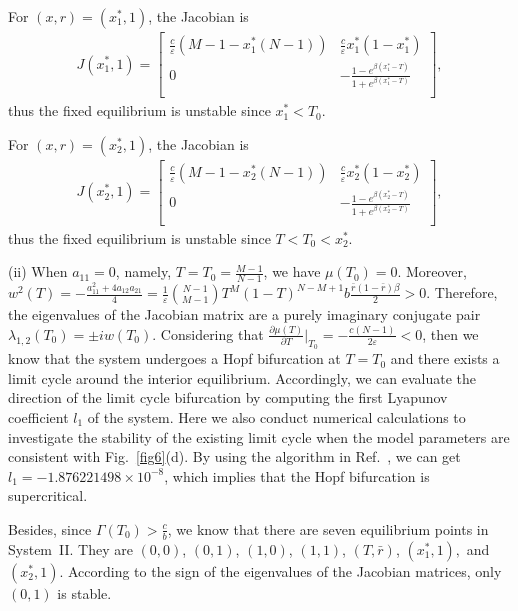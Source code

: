 \documentclass[9pt]{elife}
\begin{document}
\begin{appendixbox}
For $(x, r) = (x_{1}^{*}, 1)$, the Jacobian is
\begin{eqnarray*}
J(x_{1}^{*}, 1) =
  \left[ {\begin{array}{cc}
    \frac{c}{\varepsilon}(M-1-x_{1}^{*}(N-1)) & \frac{c}{\varepsilon}x_{1}^{*}(1-x_{1}^{*}) \\
    0 & -\frac{1-e^{\beta (x_{1}^{*}-T)}}{1+e^{\beta (x_{1}^{*}-T)}} \\
  \end{array} } \right],
\end{eqnarray*}
thus the fixed equilibrium is unstable since $x_{1}^{*}<T_{0}$.

For $(x, r) = (x_{2}^{*}, 1)$, the Jacobian is
\begin{eqnarray*}
J(x_{2}^{*}, 1) =
  \left[ {\begin{array}{cc}
    \frac{c}{\varepsilon}(M-1-x_{2}^{*}(N-1)) & \frac{c}{\varepsilon}x_{2}^{*}(1-x_{2}^{*}) \\
    0 & -\frac{1-e^{\beta (x_{2}^{*}-T)}}{1+e^{\beta (x_{2}^{*}-T)}} \\
  \end{array} } \right],
\end{eqnarray*}
thus the fixed equilibrium is unstable since $T<T_{0}<x_{2}^{*}$.


(ii) When $a_{11}=0$, namely, $T=T_{0}=\frac{M-1}{N-1}$, we have $\mu(T_{0})=0$. Moreover, $w^{2}(T)=-\frac{a_{11}^{2}+4a_{12}a_{21}}{4}=\frac{1}{\varepsilon}\binom{N-1}{M-1}T^{M}(1-T)^{N-M+1}b\frac{\bar{r}(1-\bar{r})\beta}{2}>0$. Therefore, the eigenvalues of the Jacobian matrix are a purely imaginary conjugate pair $\lambda_{1,2}(T_{0})=\pm iw(T_{0})$. Considering that $\frac{\partial \mu(T)}{\partial T}|_{T_{0}}=-\frac{c(N-1)}{2\varepsilon}<0$, then we know that the system undergoes a Hopf bifurcation at $T=T_{0}$ and there exists a limit cycle around the interior equilibrium. Accordingly, we can evaluate the direction of the limit cycle bifurcation by computing the first Lyapunov coefficient $l_{1}$ of the system. Here we also conduct numerical calculations to investigate the stability of the existing limit cycle when the model parameters are consistent with Fig.~\ref{fig6}(d). By using the algorithm in Ref.~\citep{kuznetsov1998elements}, we can get $l_{1}=-1.876221498 \times 10^{-8}$, which implies that the Hopf bifurcation is supercritical.

Besides, since $\Gamma(T_{0})>\frac{c}{b}$, we know that there are seven equilibrium points in System~II. They are $(0, 0)$, $(0, 1)$, $(1, 0)$, $(1, 1)$, $(T, \bar{r})$, $(x_{1}^{*},1),$ and $(x_{2}^{*},1)$. According to the sign of the eigenvalues of the Jacobian matrices, only $(0, 1)$ is stable.



\end{appendixbox}
\end{document}
